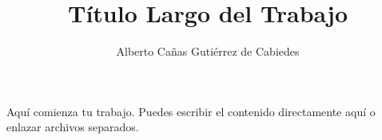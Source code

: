 \documentclass[epsbased]{tfgtfmthesisuam}
\title{Título Largo del Trabajo}{Título Corto}
\author{Alberto Cañas Gutiérrez de Cabiedes}
\begin{document}
Aquí comienza tu trabajo. Puedes escribir el contenido directamente aquí o enlazar archivos separados.



% 
% 
\end{document}
